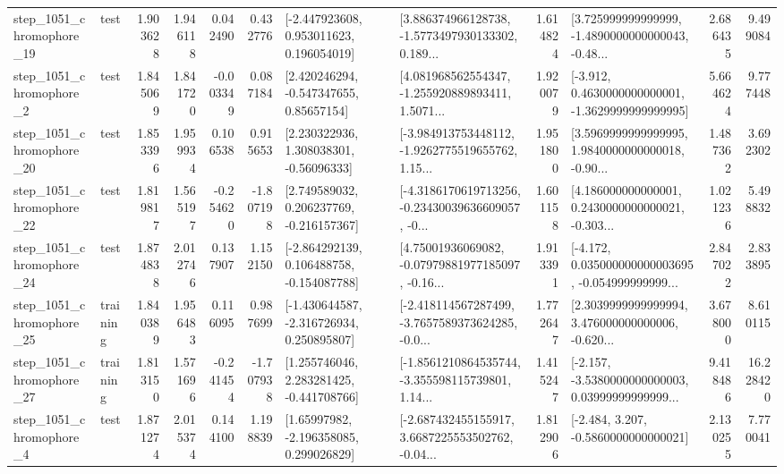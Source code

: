 \begin{tabular}{llrrrrllrlrr}
 step\_1051\_chromophore\_19 &      test &      1.903628 &    1.946118 &      0.042490 &  0.432776 &    [-2.447923608, 0.953011623, 0.196054019] &  [3.886374966128738, -1.5773497930133302, 0.189... &       1.614824 &  [3.725999999999999, -1.4890000000000043, -0.48... &            2.686435 &          9.499084 \\
  step\_1051\_chromophore\_2 &      test &      1.845069 &    1.841720 &     -0.003349 &  0.087184 &     [2.420246294, -0.547347655, 0.85657154] &  [4.081968562554347, -1.255920889893411, 1.5071... &       1.920079 &  [-3.912, 0.4630000000000001, -1.3629999999999995] &            5.664624 &          9.777448 \\
 step\_1051\_chromophore\_20 &      test &      1.853396 &    1.959934 &      0.106538 &  0.915653 &     [2.230322936, 1.308038301, -0.56096333] &  [-3.984913753448112, -1.9262775519655762, 1.15... &       1.951800 &  [3.5969999999999995, 1.9840000000000018, -0.90... &            1.487362 &          3.692302 \\
 step\_1051\_chromophore\_22 &      test &      1.819817 &    1.565197 &     -0.254620 & -1.807198 &    [2.749589032, 0.206237769, -0.216157367] &  [-4.3186170619713256, -0.23430039636609057, -0... &       1.601158 &  [4.186000000000001, 0.2430000000000021, -0.303... &            1.021236 &          5.498832 \\
 step\_1051\_chromophore\_24 &      test &      1.874838 &    2.012746 &      0.137907 &  1.152150 &   [-2.864292139, 0.106488758, -0.154087788] &  [4.75001936069082, -0.07979881977185097, -0.16... &       1.913391 &  [-4.172, 0.035000000000003695, -0.054999999999... &            2.847022 &          2.833895 \\
 step\_1051\_chromophore\_25 &  training &      1.840389 &    1.956483 &      0.116095 &  0.987699 &   [-1.430644587, -2.316726934, 0.250895807] &  [-2.418114567287499, -3.7657589373624285, -0.0... &       1.772647 &  [2.3039999999999994, 3.476000000000006, -0.620... &            3.678000 &          8.610115 \\
 step\_1051\_chromophore\_27 &  training &      1.813150 &    1.571696 &     -0.241454 & -1.707938 &    [1.255746046, 2.283281425, -0.441708766] &  [-1.8561210864535744, -3.355598115739801, 1.14... &       1.415247 &  [-2.157, -3.5380000000000003, 0.03999999999999... &            9.418486 &         16.228420 \\
  step\_1051\_chromophore\_4 &      test &      1.871274 &    2.015374 &      0.144100 &  1.198839 &     [1.65997982, -2.196358085, 0.299026829] &  [-2.687432455155917, 3.6687225553502762, -0.04... &       1.812906 &               [-2.484, 3.207, -0.5860000000000021] &            2.130255 &          7.770041 \\

\end{tabular}
